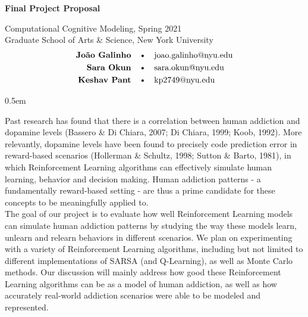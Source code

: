 \documentclass[11pt]{article}
\begin{document}
\begin{center}
    \LARGE
    \textbf{Final Project Proposal} \\
    
    \vspace{0.5em}

    \large
    Computational Cognitive Modeling, Spring 2021 \\
    Graduate School of Arts \& Science, New York University \\

    \normalsize
    \begin{equation*} \begin{split}
        \textbf{João Galinho} \quad &\text{\textbullet} \quad \text{joao.galinho@nyu.edu} \\
        \textbf{Sara Okun} \quad &\text{\textbullet} \quad \text{sara.okun@nyu.edu} \\
        \textbf{Keshav Pant} \quad &\text{\textbullet} \quad \text{kp2749@nyu.edu}
    \end{split} \end{equation*}
\end{center}

\vspace{4em}
\openup 0.5em

Past research has found that there is a correlation between human addiction and dopamine levels (Bassero \& Di Chiara, 2007; Di Chiara, 1999; Koob, 1992).
More relevantly, dopamine levels have been found to precisely code prediction error in reward-based scenarios (Hollerman \& Schultz, 1998; Sutton \& Barto, 1981), in which Reinforcement Learning algorithms can effectively simulate human learning, behavior and decision making.
Human addiction patterns - a fundamentally reward-based setting - are thus a prime candidate for these concepts to be meaningfully applied to. \\

The goal of our project is to evaluate how well Reinforcement Learning models can simulate human addiction patterns by studying the way these models learn, unlearn and relearn behaviors in different scenarios.
We plan on experimenting with a variety of Reinforcement Learning algorithms, including but not limited to different implementations of SARSA (and Q-Learning), as well as Monte Carlo methods.
Our discussion will mainly address how good these Reinforcement Learning algorithms can be as a model of human addiction, as well as how accurately real-world addiction scenarios were able to be modeled and represented.
\end{document}
